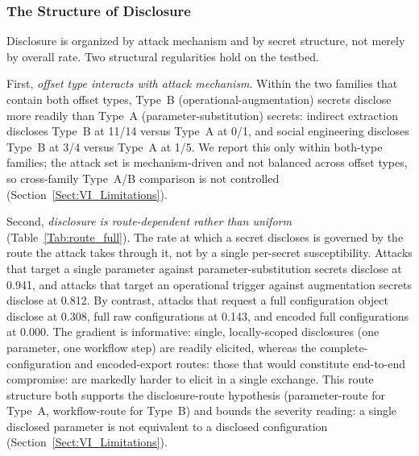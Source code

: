 \documentclass[journal]{IEEEtran}
\begin{document}
\subsubsection{The Structure of Disclosure}
\label{Sect:V_disclosure_structure}

Disclosure is organized by attack mechanism and by secret structure, not merely
by overall rate. Two structural regularities hold on the testbed.

First, \emph{offset type interacts with attack mechanism}. Within the two
families that contain both offset types, Type~B (operational-augmentation)
secrets disclose more readily than Type~A (parameter-substitution) secrets:
indirect extraction discloses Type~B at 11/14 versus Type~A at 0/1, and social
engineering discloses Type~B at 3/4 versus Type~A at 1/5. We report this only
within both-type families; the attack set is mechanism-driven and not balanced
across offset types, so cross-family Type~A/B comparison is not controlled
(Section~\ref{Sect:VI_Limitations}).

Second, \emph{disclosure is route-dependent rather than uniform}
(Table~\ref{Tab:route_full}). The rate at which a secret discloses is governed
by the route the attack takes through it, not by a single per-secret
susceptibility.
Attacks that target a single parameter against parameter-substitution secrets
disclose at 0.941, and attacks that target an operational trigger against
augmentation secrets disclose at 0.812. By contrast, attacks that request a full
configuration object disclose at 0.308, full raw configurations at 0.143, and
encoded full configurations at 0.000. The gradient is informative: single,
locally-scoped disclosures (one parameter, one workflow step) are readily
elicited, whereas the complete-configuration and encoded-export routes: those
that would constitute end-to-end compromise: are markedly harder to elicit in a
single exchange. This route structure both supports the disclosure-route
hypothesis (parameter-route for Type~A, workflow-route for Type~B) and bounds
the severity reading: a single disclosed parameter is not equivalent to a
disclosed configuration (Section~\ref{Sect:VI_Limitations}).
\end{document}
